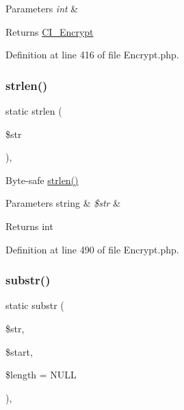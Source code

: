 \begin{DoxyParams}{Parameters}
{\em int} & \\
\hline
\end{DoxyParams}
\begin{DoxyReturn}{Returns}
\mbox{\hyperlink{class_c_i___encrypt}{C\+I\+\_\+\+Encrypt}} 
\end{DoxyReturn}


Definition at line 416 of file Encrypt.\+php.

\mbox{\label{class_c_i___encrypt_a4c29a687d4ed62c26a10e41d98930d5f}} 
\subsubsection{\texorpdfstring{strlen()}{strlen()}}
{\footnotesize\ttfamily static strlen (\begin{DoxyParamCaption}\item[{}]{\$str }\end{DoxyParamCaption})\hspace{0.3cm}{\ttfamily [static]}, {\ttfamily [protected]}}

Byte-\/safe \mbox{\hyperlink{class_c_i___encrypt_a4c29a687d4ed62c26a10e41d98930d5f}{strlen()}}


\begin{DoxyParams}[1]{Parameters}
string & {\em \$str} & \\
\hline
\end{DoxyParams}
\begin{DoxyReturn}{Returns}
int 
\end{DoxyReturn}


Definition at line 490 of file Encrypt.\+php.

\mbox{\label{class_c_i___encrypt_a101caef57ef0b165da5747e2c2e6c9dc}} 
\subsubsection{\texorpdfstring{substr()}{substr()}}
{\footnotesize\ttfamily static substr (\begin{DoxyParamCaption}\item[{}]{\$str,  }\item[{}]{\$start,  }\item[{}]{\$length = {\ttfamily NULL} }\end{DoxyParamCaption})\hspace{0.3cm}{\ttfamily [static]}, {\ttfamily [protected]}}

